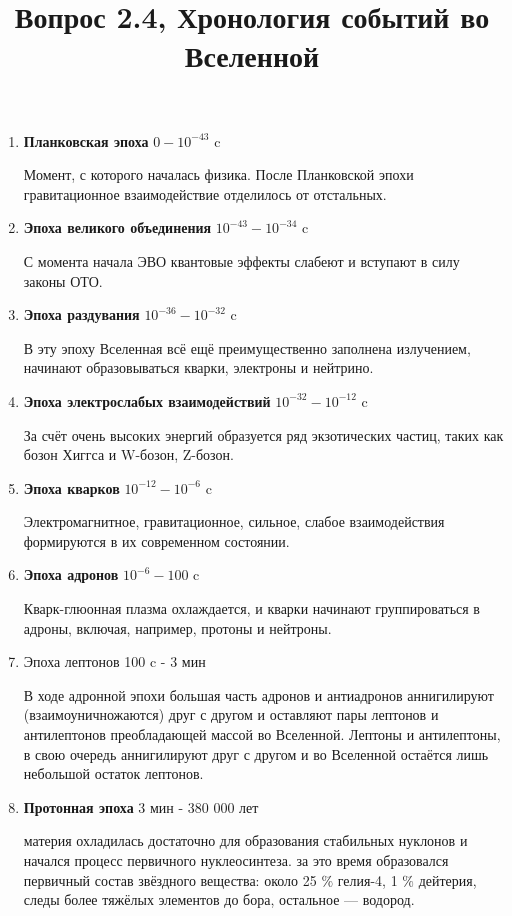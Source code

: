 \documentclass[a4paper, 12pt]{article}
\begin{document}
\title{Вопрос 2.4, Хронология событий во Вселенной}

\begin{enumerate}
\item \textbf{Планковская эпоха}  $0 - 10^{-43}$ c

Момент, с которого началась физика. После Планковской эпохи гравитационное взаимодействие отделилось от отстальных.
\item \textbf{Эпоха великого объединения} $10^{-43} - 10^{-34}$ c

С момента начала ЭВО квантовые эффекты слабеют и вступают в силу законы ОТО.

\item \textbf{Эпоха раздувания} $10^{-36} - 10^{-32}$ c

В эту эпоху Вселенная всё ещё преимущественно заполнена излучением, начинают образовываться кварки, электроны и нейтрино.

\item \textbf{Эпоха электрослабых взаимодействий} $10^{-32} - 10^{-12}$ c

За счёт очень высоких энергий образуется ряд экзотических частиц, таких как бозон Хиггса и W-бозон, Z-бозон.

\item \textbf{Эпоха кварков} $10^{-12} - 10^{-6}$ c

Электромагнитное, гравитационное, сильное, слабое взаимодействия формируются в их современном состоянии.

\item \textbf{Эпоха адронов} $10^{-6} - 100$ c

Кварк-глюонная плазма охлаждается, и кварки начинают группироваться в адроны, включая, например, протоны и нейтроны.

\item Эпоха лептонов 100 c - 3 мин

В ходе адронной эпохи большая часть адронов и антиадронов аннигилируют (взаимоуничножаются) друг с другом и оставляют пары лептонов и антилептонов преобладающей массой во Вселенной. Лептоны и антилептоны, в свою очередь аннигилируют друг с другом и во Вселенной остаётся лишь небольшой остаток лептонов.

\item \textbf{Протонная эпоха} 3 мин - 380 000 лет

материя охладилась достаточно для образования стабильных нуклонов и начался процесс первичного нуклеосинтеза. за это время образовался первичный состав звёздного вещества: около 25 $\%$ гелия-4, 1 $\%$ дейтерия, следы более тяжёлых элементов до бора, остальное — водород.


\end{enumerate}
\end{document}
